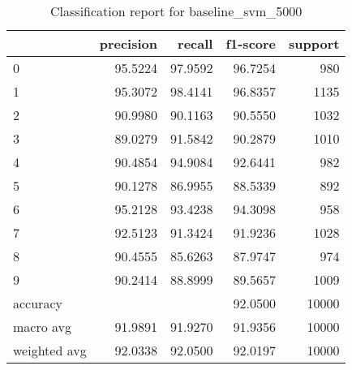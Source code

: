 \begin{table}[htb!]
\centering
\begin{tabular}{lrrrr}
    \toprule
    & precision & recall & f1-score & support \\
    \midrule
0 & 95.5224 & 97.9592 & 96.7254 & 980 \\
1 & 95.3072 & 98.4141 & 96.8357 & 1135 \\
2 & 90.9980 & 90.1163 & 90.5550 & 1032 \\
3 & 89.0279 & 91.5842 & 90.2879 & 1010 \\
4 & 90.4854 & 94.9084 & 92.6441 & 982 \\
5 & 90.1278 & 86.9955 & 88.5339 & 892 \\
6 & 95.2128 & 93.4238 & 94.3098 & 958 \\
7 & 92.5123 & 91.3424 & 91.9236 & 1028 \\
8 & 90.4555 & 85.6263 & 87.9747 & 974 \\
9 & 90.2414 & 88.8999 & 89.5657 & 1009 \\
accuracy & & & 92.0500 & 10000 \\
macro avg & 91.9891 & 91.9270 & 91.9356 & 10000 \\
weighted avg & 92.0338 & 92.0500 & 92.0197 & 10000 \\
\bottomrule
\end{tabular}
\caption{Classification report for baseline\_svm\_5000}
\label{tab:classification-report-baseline_svm_5000}
\end{table}
